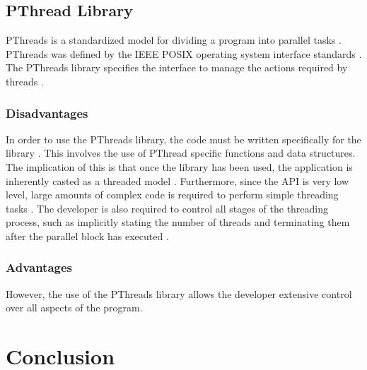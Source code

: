 \documentclass[10pt,twocolumn]{witseiepaper}
\begin{document}
\subsection{PThread Library}
PThreads is a standardized model for dividing a program into parallel tasks \cite{pthreads}. PThreads was defined by the IEEE POSIX operating system interface standards \cite{pthreads}. The PThreads library specifies the interface to manage the actions required by threads \cite{pthreadVSopen}.

\subsubsection{Disadvantages}
In order to use the PThreads library, the code must be written specifically for the library \cite{pthreadVSopen}. This involves the use of PThread specific functions and data structures. The implication of this is that once the library has been used, the application is inherently casted as a threaded model \cite{pthreadVSopen}. Furthermore, since the API is very low level, large amounts of complex code is required to perform simple threading tasks \cite{pthreadVSopen}. The developer is also required to control all stages of the threading process, such as implicitly stating the number of threads and terminating them after the parallel block has executed \cite{pthreadVSopen}.

\subsubsection{Advantages}
However, the use of the PThreads library allows the developer extensive control over all aspects of the program.

\section{Conclusion}



\end{document}
